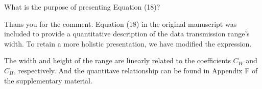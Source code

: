 \begin{revcomment}
	What is the purpose of presenting Equation (18)?
\end{revcomment}
\begin{revresponse}
	Thans you for the comment.
	Equation (18) in the original manuscript was included to provide a quantitative description of the data transmission range's width.
	To retain a more holistic presentation, we have modified the expression.
	\begin{changes}
		The width and height of the range are linearly related to the coefficients $C_W$ and $C_H$, respectively.
		And the quantitave relationship can be found in Appendix F of the supplementary material.
	\end{changes}
\end{revresponse}

